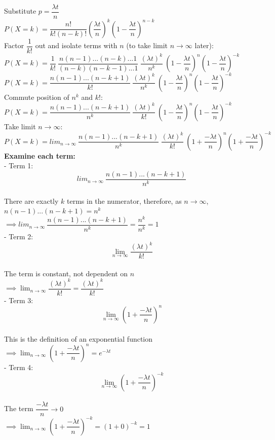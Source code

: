 \documentclass{article}
\begin{document}
Substitute $p = \dfrac{\lambda t}{n}$ \\
$P(X=k) = \dfrac{n!}{k!(n-k)!} \left( \dfrac{\lambda t}{n} \right)^k\left( 1 - \dfrac{\lambda t}{n} \right)^{n-k}$ \\

Factor $\dfrac{1}{k!}$ out and isolate terms with $n$ (to take limit $n \rightarrow \infty$ later): \\
$P(X=k) = \dfrac{1}{k!} \ \dfrac{n(n-1)...(n-k)...1}{(n-k)(n-k-1)...1} \ \dfrac{(\lambda t)^k}{n^k} \ \left( 1 - \dfrac{\lambda t}{n} \right)^{n}  \left( 1 - \dfrac{\lambda t}{n} \right)^{-k}$ \\


$P(X=k) = \dfrac{n(n-1)...(n-k+1)}{k!} \ \dfrac{(\lambda t)^k}{n^k} \ \left( 1 - \dfrac{\lambda t}{n} \right)^{n}  \left( 1 - \dfrac{\lambda t}{n} \right)^{-k}$ \\

Commute position of $n^k$ and $k!$: \\
$P(X=k) = \dfrac{n(n-1)...(n-k+1)}{n^k} \ \dfrac{(\lambda t)^k}{k!} \ \left( 1 - \dfrac{\lambda t}{n} \right)^{n}  \left( 1 - \dfrac{\lambda t}{n} \right)^{-k}$ \\

Take limit $n \rightarrow \infty$: \\
$P(X=k) = lim_{n\rightarrow \infty} \ \dfrac{n(n-1)...(n-k+1)}{n^k} \ \dfrac{(\lambda t)^k}{k!} \ \left( 1 + \dfrac{-\lambda t}{n} \right)^{n}  \left( 1 + \dfrac{-\lambda t}{n} \right)^{-k}$ \\


\textbf{Examine each term:} \\ 
- Term 1: \\
$$lim_{n\rightarrow \infty} \ \dfrac{n(n-1)...(n-k+1)}{n^k} $$ \\
There are exactly $k$ terms in the numerator, therefore, as $n \rightarrow \infty$, \\ $n(n-1)...(n-k+1)  = n^k$ \\
$\implies lim_{n\rightarrow \infty} \ \dfrac{n(n-1)...(n-k+1)}{n^k} = \dfrac{n^k}{n^k} = 1$ \\
- Term 2:
$$\lim_{n \to \infty} \dfrac{(\lambda t)^k}{k!}$$ \\
The term is constant, not dependent on $n$ \\
$\implies \lim_{n \to \infty} \dfrac{(\lambda t)^k}{k!} = \dfrac{(\lambda t)^k}{k!}$ \\
- Term 3:  \\
$$\lim_{n \to \infty} \left(1 + \dfrac{-\lambda t}{n}\right)^n$$ \\
This is the definition of an exponential function \\
$\implies \lim_{n \to \infty} \left(1 + \dfrac{-\lambda t}{n}\right)^n = e^{-\lambda t}$ \\
- Term 4: \\
$$\lim_{n \to \infty} \left(1 + \dfrac{-\lambda t}{n}\right)^{-k}$$ \\
The term $\dfrac{-\lambda t}{n} \rightarrow 0 $\\
$\implies \lim_{n \to \infty} \left(1 + \dfrac{-\lambda t}{n}\right)^{-k} = (1 +0)^{-k} = 1$ \\
\end{document}
